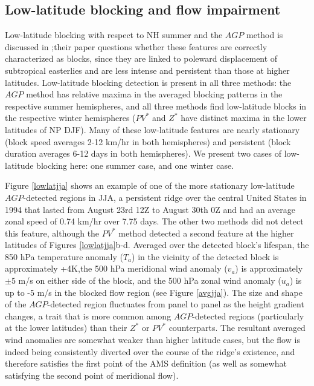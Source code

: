 \documentclass[smallextended]{svjour3}       %
\numberwithin{equation}{section}
\begin{document}
\subsection{Low-latitude blocking and flow impairment}\label{lowlatsec}

Low-latitude blocking with respect to NH summer and the $AGP$ method is discussed in \cite{davini_bidimensional_2012};their paper questions whether these features are correctly characterized as blocks, since they are linked to poleward displacement of subtropical easterlies and are less intense and persistent than those at higher latitudes. Low-latitude blocking detection is present in all three methods: the $AGP$ method has relative maxima in the averaged blocking patterns in the respective summer hemispheres, and all three methods find low-latitude blocks in the respective winter hemispheres ($PV^*$ and $Z^*$ have distinct maxima in the lower latitudes of NP DJF). Many of these low-latitude features are nearly stationary (block speed averages 2-12 km/hr in both hemispheres) and persistent (block duration averages 6-12 days in both hemispheres). We present two cases of low-latitude blocking here: one summer case, and one winter case.

Figure \ref{lowlatjja} shows an example of one of the more stationary low-latitude $AGP$-detected regions in JJA, a persistent ridge over the central United States in 1994 that lasted from August 23rd 12Z to August 30th 0Z and had an average zonal speed of 0.74 km/hr over 7.75 days. The other two methods did not detect this feature, although the $PV^*$ method detected a second feature at the higher latitudes of Figures \ref{lowlatjja}b-d. Averaged over the detected block's lifespan, the 850 hPa temperature anomaly ($T_a$) in the vicinity of the detected block is approximately +4K,the 500 hPa meridional wind anomaly ($v_a$) is approximately $\pm5$ m/s on either side of the block, and the 500 hPa zonal wind anomaly ($u_a$) is up to -5 m/s in the blocked flow region (see Figure \ref{avgjja}). The size and shape of the $AGP$-detected region fluctuates from panel to panel as the height gradient changes, a trait that is more common among $AGP$-detected regions (particularly at the lower latitudes) than their $Z^*$ or $PV^*$ counterparts. The resultant averaged wind anomalies are somewhat weaker than higher latitude cases, but the flow is indeed being consistently diverted over the course of the ridge's existence, and therefore satisfies the first point of the AMS definition (as well as somewhat satisfying the second point of meridional flow).
\end{document}
